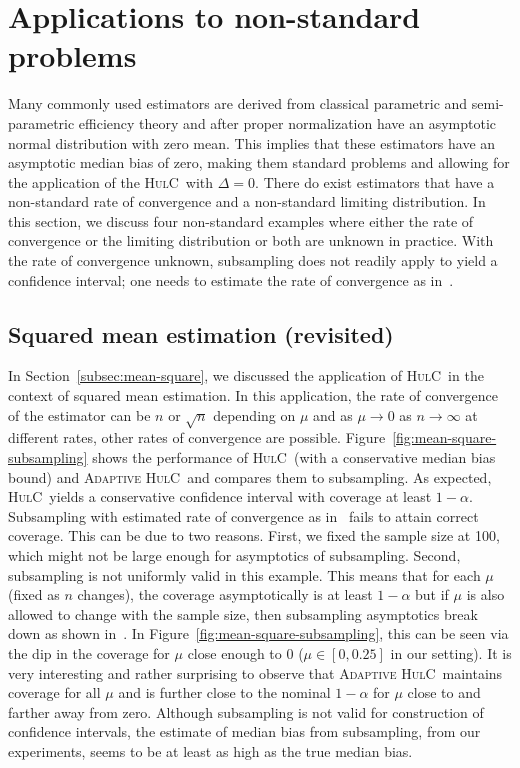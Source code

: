 \documentclass{article}
\newcommand{\hulc}{\textsc{HulC}~}
\newcommand{\ahulc}{\textsc{Adaptive HulC}~}
\numberwithin{myalgctr}{section}
\begin{document}
\section{Applications to non-standard problems}\label{sec:applications-nonparametric-models}
Many commonly used estimators are derived from classical parametric and semi-parametric efficiency theory and {\color{black}after proper normalization} have an asymptotic normal distribution with zero mean. This implies that these estimators have an asymptotic median bias of zero, making them standard problems and allowing for the application of the \hulc with $\Delta = 0$. There do exist estimators that have a non-standard rate of convergence and a non-standard limiting distribution. In this section, we discuss {four} non-standard examples where either the rate of convergence or the limiting distribution or both are unknown in practice. With the rate of convergence unknown, subsampling does not readily apply to yield a confidence interval; one needs to estimate the rate of convergence as in~\cite{bertail1999subsampling}.
\subsection{Squared mean estimation (revisited)}\label{subsec:squared-mean-revisited}
{\color{black}In Section~\ref{subsec:mean-square}, we discussed the application of \hulc in the context of squared mean estimation. In this application, the rate of convergence of the estimator can be $n$ or $\sqrt{n}$ depending on $\mu$ and as $\mu\to0$ as $n\to\infty$ at different rates, other rates of convergence are possible. Figure~\ref{fig:mean-square-subsampling} shows the performance of \hulc (with a conservative median bias bound) and \ahulc and compares them to subsampling. As expected, \hulc yields a conservative confidence interval with coverage at least $1-\alpha$. Subsampling with estimated rate of convergence as in~\cite{bertail1999subsampling} fails to attain correct coverage. This can be due to two reasons. First, we fixed the sample size at 100, which might not be large enough for asymptotics of subsampling. Second, subsampling is not uniformly valid in this example. This means that for each $\mu$ (fixed as $n$ changes), the coverage asymptotically is at least $1-\alpha$ but if $\mu$ is also allowed to change with the sample size, then subsampling asymptotics break down as shown in~\cite{andrews2010asymptotic}. In Figure~\ref{fig:mean-square-subsampling}, this can be seen via the dip in the coverage for $\mu$ close enough to $0$ ($\mu\in[0, 0.25]$ in our setting). It is very interesting and rather surprising to observe that \ahulc maintains coverage for all $\mu$ and is further close to the nominal $1-\alpha$ for $\mu$ close to and farther away from zero. Although subsampling is not valid for construction of confidence intervals, the estimate of median bias from subsampling, from our experiments, seems to be at least as high as the true median bias.}
\end{document}
